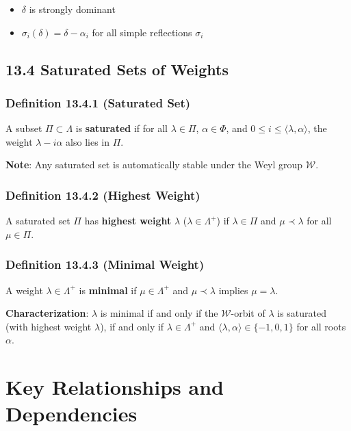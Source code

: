 \begin{itemize}
	\item $\delta$ is strongly dominant
	\item $\sigma_i(\delta) = \delta - \alpha_i$ for all simple reflections $\sigma_i$
\end{itemize}

\subsection{13.4 Saturated Sets of Weights}

\subsubsection{Definition 13.4.1 (Saturated Set)}

A subset $\Pi \subset \Lambda$ is \textbf{saturated} if for all $\lambda \in \Pi$, $\alpha \in \Phi$, and $0 \leq i \leq \langle\lambda, \alpha\rangle$, the weight $\lambda - i\alpha$ also lies in $\Pi$.

\textbf{Note}: Any saturated set is automatically stable under the Weyl group $\mathcal{W}$.

\subsubsection{Definition 13.4.2 (Highest Weight)}

A saturated set $\Pi$ has \textbf{highest weight} $\lambda$ ($\lambda \in \Lambda^+$) if $\lambda \in \Pi$ and $\mu \prec \lambda$ for all $\mu \in \Pi$.

\subsubsection{Definition 13.4.3 (Minimal Weight)}

A weight $\lambda \in \Lambda^+$ is \textbf{minimal} if $\mu \in \Lambda^+$ and $\mu \prec \lambda$ implies $\mu = \lambda$.

\textbf{Characterization}: $\lambda$ is minimal if and only if the $\mathcal{W}$-orbit of $\lambda$ is saturated (with highest weight $\lambda$), if and only if $\lambda \in \Lambda^+$ and $\langle\lambda, \alpha\rangle \in \{-1, 0, 1\}$ for all roots $\alpha$.


\section{Key Relationships and Dependencies}

